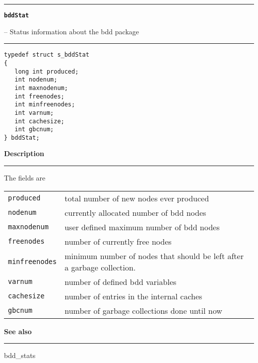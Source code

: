 \begin{minipage}{\textwidth}

\noindent\begin{minipage}{\textwidth}
\rule{\textwidth}{0.5mm}
{\tt\bf bddStat }
\--- Status information about the bdd package  \hspace{\fill}
\\\rule[1.5ex]{\textwidth}{0.5mm}
\end{minipage}

\noindent\begin{verbatim}
typedef struct s_bddStat
{
   long int produced;
   int nodenum;
   int maxnodenum;
   int freenodes;
   int minfreenodes;
   int varnum;
   int cachesize;
   int gbcnum;
} bddStat;  
\end{verbatim}

\vspace{\parsep}\noindent
{\bf Description}\\\rule[1.5ex]{\textwidth}{0.2mm}\vspace{-1.5ex}\setlength{\parindent}{1em}
The fields are \\[\baselineskip] \begin{tabular}{lp{10cm}}
  {\tt produced}     & total number of new nodes ever produced \\
  {\tt nodenum}      & currently allocated number of bdd nodes \\
  {\tt maxnodenum}   & user defined maximum number of bdd nodes \\
  {\tt freenodes}    & number of currently free nodes \\
  {\tt minfreenodes} & minimum number of nodes that should be left after a
                       garbage collection. \\
  {\tt varnum}       & number of defined bdd variables \\
  {\tt cachesize}    & number of entries in the internal caches \\
  {\tt gbcnum}       & number of garbage collections done until now
  \end{tabular} 

\vspace{\parsep}\vspace{\baselineskip}\noindent
{\bf See also}\\\rule[1.5ex]{\textwidth}{0.2mm}\vspace{-1.5ex}
bdd\_stats 
\end{minipage}
\vspace{8ex}
